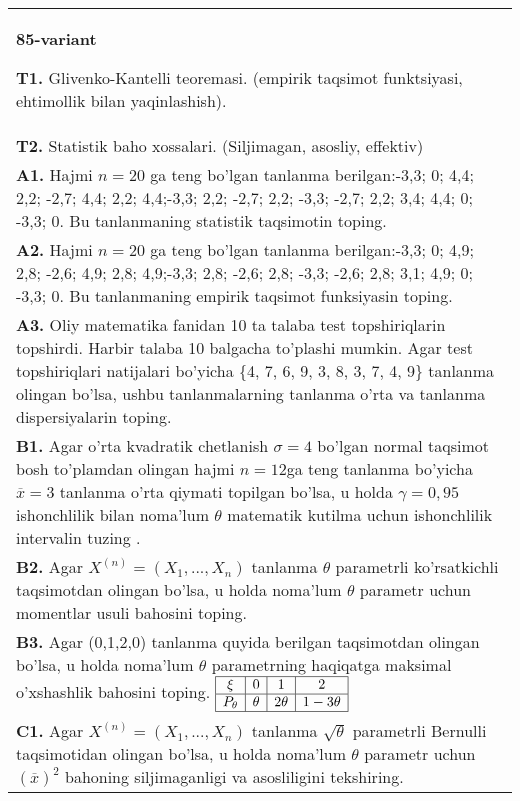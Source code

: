 \documentclass{article}
\begin{document}
\begin{tabular}{m{17cm}}
\textbf{85-variant}
\newline

\textbf{T1.} 
Glivenko-Kantelli teoremasi. (empirik taqsimot funktsiyasi, ehtimollik bilan yaqinlashish).
\\
\textbf{T2.} 
Statistik baho xossalari. (Siljimagan, asosliy, effektiv)
\\
\textbf{A1.} 
Hajmi \(n = 20\) ga teng bo'lgan tanlanma berilgan:-3,3; 0; 4,4; 2,2; -2,7; 4,4; 2,2; 4,4;-3,3; 2,2; -2,7; 2,2; -3,3; -2,7; 2,2; 3,4; 4,4; 0; -3,3; 0. Bu tanlanmaning statistik taqsimotin toping.
\\
\textbf{A2.} 
Hajmi \(n = 20\) ga teng bo'lgan tanlanma berilgan:-3,3; 0; 4,9; 2,8; -2,6; 4,9; 2,8; 4,9;-3,3; 2,8; -2,6; 2,8; -3,3; -2,6; 2,8; 3,1; 4,9; 0; -3,3; 0. Bu tanlanmaning empirik taqsimot funksiyasin toping.
\\
\textbf{A3.} 
Oliy matematika fanidan 10 ta talaba test topshiriqlarin topshirdi. Harbir talaba 10 balgacha to'plashi mumkin. Agar test topshiriqlari natijalari bo'yicha \{4, 7, 6, 9, 3, 8, 3, 7, 4, 9\} tanlanma olingan bo'lsa, ushbu tanlanmalarning tanlanma o'rta va tanlanma dispersiyalarin toping.
\\
\textbf{B1.} 
Agar o'rta kvadratik chetlanish \(\sigma = 4\) bo'lgan normal taqsimot bosh to'plamdan olingan hajmi \(n = 12\)ga teng tanlanma bo'yicha \(\overline{x} = 3\) tanlanma o'rta qiymati topilgan bo'lsa, u holda \(\gamma = 0,95\) ishonchlilik bilan noma'lum \(\theta\) matematik kutilma uchun ishonchlilik intervalin tuzing .
\\
\textbf{B2.} 
Agar \(X^{(n)} = \left( X_{1},...,X_{n} \right)\) tanlanma \(\theta\) parametrli ko'rsatkichli taqsimotdan olingan bo'lsa, u holda noma'lum \(\theta\) parametr uchun momentlar usuli bahosini toping.
\\
\textbf{B3.} 
Agar (0,1,2,0) tanlanma quyida berilgan taqsimotdan olingan bo'lsa, u holda noma'lum \(\theta\) parametrning haqiqatga maksimal o'xshashlik bahosini toping.
$\begin{array}{|c|c|c|c|}
    \hline
    \xi & 0 & 1 & 2 \\
    \hline
    P_{\theta} & \theta & 2\theta & 1 - 3\theta \\
    \hline
\end{array}$
\\
\textbf{C1.} 
Agar \(X^{(n)} = \left( X_{1},...,X_{n} \right)\) tanlanma \(\sqrt{\theta}\) parametrli Bernulli taqsimotidan olingan bo'lsa, u holda noma'lum \(\theta\) parametr uchun \((\overline{x})^{2}\) bahoning siljimaganligi va asosliligini tekshiring.

\end{tabular}
\end{document}
